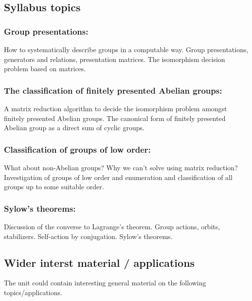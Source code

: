 \subsection{Syllabus topics}\label{syllabus-topics-2}

\subsubsection{Group presentations:}\label{group-presentations}

How to systematically describe groups in a computable way. Group
presentations, generators and relations, presentation matrices. The
isomorphism decision problem based on matrices.

\subsubsection{The classification of finitely presented Abelian
groups:}\label{the-classification-of-finitely-presented-abelian-groups}

A matrix reduction algorithm to decide the isomorphism problem amongst
finitely presented Abelian groups. The canonical form of finitely
presented Abelian group as a direct sum of cyclic groups.

\subsubsection{Classification of groups of low
order:}\label{classification-of-groups-of-low-order}

What about non-Abelian groups? Why we can't solve using matrix
reduction? Investigation of groups of low order and enumeration and
classification of all groups up to some suitable order.

\subsubsection{Sylow's theorems:}\label{sylows-theorems}

Discussion of the converse to Lagrange's theorem. Group actions, orbits,
stabilizers. Self-action by conjugation. Sylow's theorems.

\subsection{Wider interst material /
applications}\label{wider-interst-material-applications}

The unit could contain interesting general material on the following
topics/applications.


